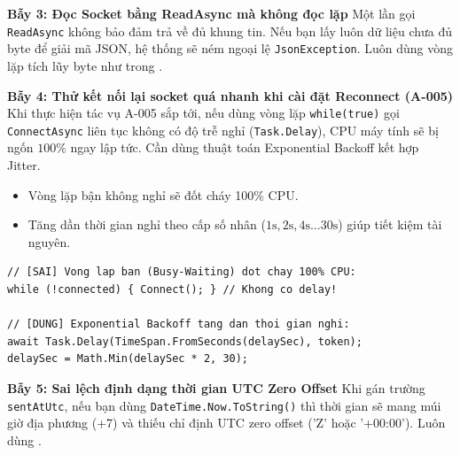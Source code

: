 \documentclass[12pt,a4paper]{article}
\begin{document}
\begin{pitfallbox}
\textbf{Bẫy 3: Đọc Socket bằng ReadAsync mà không đọc lặp}
\newline Một lần gọi \texttt{ReadAsync} không bảo đảm trả về đủ khung tin. Nếu bạn lấy luôn dữ liệu chưa đủ byte để giải mã JSON, hệ thống sẽ ném ngoại lệ \texttt{JsonException}. Luôn dùng vòng lặp tích lũy byte như trong .
\end{pitfallbox}

\begin{pitfallbox}
\textbf{Bẫy 4: Thử kết nối lại socket quá nhanh khi cài đặt Reconnect (A-005)}
\newline Khi thực hiện tác vụ A-005 sắp tới, nếu dùng vòng lặp \texttt{while(true)} gọi \texttt{ConnectAsync} liên tục không có độ trễ nghỉ (\texttt{Task.Delay}), CPU máy tính sẽ bị ngốn $100\%$ ngay lập tức. Cần dùng thuật toán Exponential Backoff kết hợp Jitter.
\end{pitfallbox}

\begin{orientationbox}
\begin{itemize}[leftmargin=1.5em, itemsep=1pt]
  \item Vòng lặp bận không nghỉ sẽ đốt cháy 100\% CPU.
  \item Tăng dần thời gian nghỉ theo cấp số nhân ($1\text{s}, 2\text{s}, 4\text{s} \dots 30\text{s}$) giúp tiết kiệm tài nguyên.
\end{itemize}
\end{orientationbox}

\begin{lstlisting}[language=CSharp, caption={So sánh Bẫy 4: Vòng lặp bận (Busy Wait) vs Exponential Backoff}]
// [SAI] Vong lap ban (Busy-Waiting) dot chay 100% CPU:
while (!connected) { Connect(); } // Khong co delay!

// [DUNG] Exponential Backoff tang dan thoi gian nghi:
await Task.Delay(TimeSpan.FromSeconds(delaySec), token);
delaySec = Math.Min(delaySec * 2, 30);
\end{lstlisting}

\begin{pitfallbox}
\textbf{Bẫy 5: Sai lệch định dạng thời gian UTC Zero Offset}
\newline Khi gán trường \texttt{sentAtUtc}, nếu bạn dùng \texttt{DateTime.Now.ToString()} thì thời gian sẽ mang múi giờ địa phương (+7) và thiếu chỉ định UTC zero offset ('Z' hoặc '+00:00'). Luôn dùng .
\end{pitfallbox}
\end{document}
